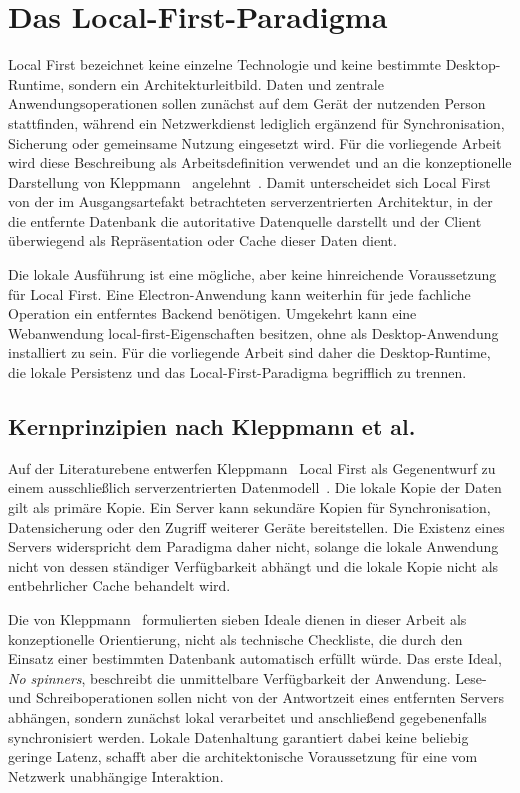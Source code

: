 \section{Das Local-First-Paradigma}
\label{sec:local-first}
Local First bezeichnet keine einzelne Technologie und keine bestimmte Desktop-Runtime, sondern ein Architekturleitbild.
Daten und zentrale Anwendungsoperationen sollen zunächst auf dem Gerät der nutzenden Person stattfinden, während ein Netzwerkdienst lediglich ergänzend für Synchronisation, Sicherung oder gemeinsame Nutzung eingesetzt wird.
Für die vorliegende Arbeit wird diese Beschreibung als Arbeitsdefinition verwendet und an die konzeptionelle Darstellung von Kleppmann~\etal{} angelehnt~\cite{kleppmann2019localfirst}.
Damit unterscheidet sich Local First von der im Ausgangsartefakt betrachteten serverzentrierten Architektur, in der die entfernte Datenbank die autoritative Datenquelle darstellt und der Client überwiegend als Repräsentation oder Cache dieser Daten dient.

Die lokale Ausführung ist eine mögliche, aber keine hinreichende Voraussetzung für Local First.
Eine Electron-Anwendung kann weiterhin für jede fachliche Operation ein entferntes Backend benötigen.
Umgekehrt kann eine Webanwendung local-first-Eigenschaften besitzen, ohne als Desktop-Anwendung installiert zu sein.
Für die vorliegende Arbeit sind daher die Desktop-Runtime, die lokale Persistenz und das Local-First-Paradigma begrifflich zu trennen.
\subsection{Kernprinzipien nach Kleppmann et al.}
\label{sec:local-first-prinzipien}
Auf der Literaturebene entwerfen Kleppmann~\etal{} Local First als Gegenentwurf zu einem ausschließlich serverzentrierten Datenmodell~\cite{kleppmann2019localfirst}.
Die lokale Kopie der Daten gilt als primäre Kopie.
Ein Server kann sekundäre Kopien für Synchronisation, Datensicherung oder den Zugriff weiterer Geräte bereitstellen.
Die Existenz eines Servers widerspricht dem Paradigma daher nicht, solange die lokale Anwendung nicht von dessen ständiger Verfügbarkeit abhängt und die lokale Kopie nicht als entbehrlicher Cache behandelt wird.

Die von Kleppmann~\etal{} formulierten sieben Ideale dienen in dieser Arbeit als konzeptionelle Orientierung, nicht als technische Checkliste, die durch den Einsatz einer bestimmten Datenbank automatisch erfüllt würde.
Das erste Ideal, \emph{No spinners}, beschreibt die unmittelbare Verfügbarkeit der Anwendung.
Lese- und Schreiboperationen sollen nicht von der Antwortzeit eines entfernten Servers abhängen, sondern zunächst lokal verarbeitet und anschließend gegebenenfalls synchronisiert werden.
Lokale Datenhaltung garantiert dabei keine beliebig geringe Latenz, schafft aber die architektonische Voraussetzung für eine vom Netzwerk unabhängige Interaktion.

